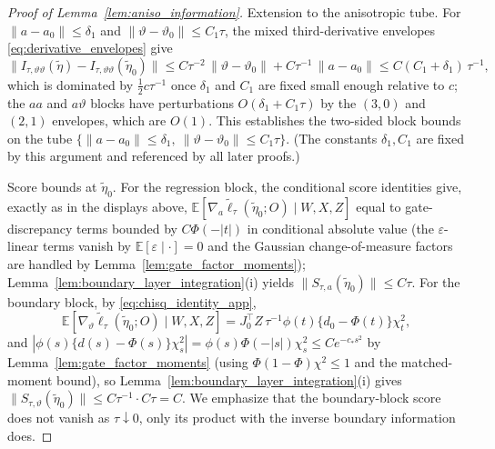 \documentclass[10pt,a4paper]{amsart}
\newcommand{\E}{\mathbb{E}}
\begin{document}
\begin{proof}[Proof of Lemma~\ref{lem:aniso_information}]
Extension to the anisotropic tube. For $\|a-a_0\|\le\delta_1$ and $\|\vartheta-\vartheta_0\|\le C_1\tau$, the mixed third-derivative envelopes \eqref{eq:derivative_envelopes} give
\[
\|I_{\tau,\vartheta\vartheta}(\tilde\eta)-I_{\tau,\vartheta\vartheta}(\tilde\eta_0)\|
\le C\tau^{-2}\,\|\vartheta-\vartheta_0\|+C\tau^{-1}\,\|a-a_0\|
\le C(C_1+\delta_1)\,\tau^{-1},
\]
which is dominated by $\tfrac12c\tau^{-1}$ once $\delta_1$ and $C_1$ are fixed small enough relative to $c$; the $aa$ and $a\vartheta$ blocks have perturbations $O(\delta_1+C_1\tau)$ by the $(3,0)$ and $(2,1)$ envelopes, which are $O(1)$. This establishes the two-sided block bounds on the tube $\{\|a-a_0\|\le\delta_1,\ \|\vartheta-\vartheta_0\|\le C_1\tau\}$. (The constants $\delta_1,C_1$ are fixed by this argument and referenced by all later proofs.)

Score bounds at $\tilde\eta_0$. For the regression block, the conditional score identities give, exactly as in the displays above,
$\E[\nabla_a\tilde\ell_\tau(\tilde\eta_0;O)\mid W,X,Z]$ equal to gate-discrepancy terms bounded by $C\Phi(-|t|)$ in conditional absolute value (the $\varepsilon$-linear terms vanish by $\E[\varepsilon\mid\cdot]=0$ and the Gaussian change-of-measure factors are handled by Lemma~\ref{lem:gate_factor_moments}); Lemma~\ref{lem:boundary_layer_integration}(i) yields $\|S_{\tau,a}(\tilde\eta_0)\|\le C\tau$. For the boundary block, by \eqref{eq:chisq_identity_app},
\[
\E[\nabla_\vartheta\tilde\ell_\tau(\tilde\eta_0;O)\mid W,X,Z]
=J_0^\top Z\,\tau^{-1}\phi(t)\{d_0-\Phi(t)\}\chi^2_t ,
\]
and $|\phi(s)\{d(s)-\Phi(s)\}\chi^2_s|=\phi(s)\Phi(-|s|)\chi^2_s\le Ce^{-c_*s^2}$ by Lemma~\ref{lem:gate_factor_moments} (using $\Phi(1-\Phi)\chi^2\le1$ and the matched-moment bound), so Lemma~\ref{lem:boundary_layer_integration}(i) gives $\|S_{\tau,\vartheta}(\tilde\eta_0)\|\le C\tau^{-1}\cdot C\tau=C$. We emphasize that the boundary-block score does not vanish as $\tau\downarrow0$, only its product with the inverse boundary information does.
\end{proof}
\end{document}
